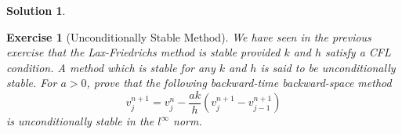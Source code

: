 \documentclass[10pt,letterpaper]{article}
\newcommand{\rb}[1]{ \left(  {#1} \right) }
\newcommand{\frb}[1]{ \left(  {#1} \right) }
\theoremstyle{break}
\newtheorem{exercise}{Exercise}
\newtheorem{solution}{Solution}
\begin{document}
\begin{solution}
\end{solution}













\begin{exercise}[Unconditionally Stable Method]
	We have seen in the previous exercise that the Lax-Friedrichs
	method is stable provided $k$ and $h$ satisfy a CFL condition.
	A method which is stable for any $k$ and $h$ is said to be
	\textit{unconditionally stable}.
	For $a>0$, prove that the following backward-time backward-space method
	$$
		v_{j}^{n+1}=v_j^n-\frac{ak}{h}(v_{j}^{n+1}-v_{j-1}^{n+1})
	$$
	is unconditionally stable in the $l^\infty$ norm.
\end{exercise}
\end{document}
